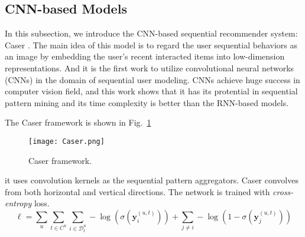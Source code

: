 \subsection{CNN-based Models}
In this subsection, we introduce the CNN-based sequential recommender system: Caser
\cite{tang2018personalized}. The main idea of this model is to regard the user
sequential behaviors as an image by embedding the user's recent interacted items
into low-dimension representations. And it is the first work to utilize convolutional
neural networks (CNNs) in the domain of sequential user modeling. CNNs achieve
huge success in computer vision field, and this work shows that it has its
protential in sequential pattern mining and its time complexity is better than
the RNN-based models.

The Caser framework is shown in Fig.~\ref{fig:caser}
\begin{figure}[h]
	\centering
	\texttt{[image: Caser.png]}
	\caption{Caser framework.}
	\label{fig:caser}
	\vspace{-10pt}
\end{figure}
it uses convolution kernels as the sequential pattern aggregators. Caser
convolves from both horizontal and vertical directions.
The network is trained with \textit{cross-entropy} loss.
\begin{equation}
    \ell=\sum_{u} \sum_{t \in C^{u}} \sum_{i \in \mathcal{D}_{t}^{u}}-\log \left(\sigma\left(\boldsymbol{y}_{i}^{(u, t)}\right)\right)+\sum_{j \neq i}-\log \left(1-\sigma\left(\boldsymbol{y}_{j}^{(u, t)}\right)\right)
\end{equation}

